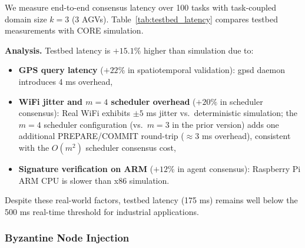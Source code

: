 \documentclass[manuscript,screen,review]{acmart}
\begin{document}
We measure end-to-end consensus latency over 100 tasks with task-coupled domain size $k = 3$ (3 AGVs). Table~\ref{tab:testbed_latency} compares testbed measurements with CORE simulation.

\begin{table}[h]
\centering
\caption{Consensus Latency: Testbed vs.\ CORE Simulation ($k=3$, $m=4$)}
\label{tab:testbed_latency}
\small
{}
\end{table}

\textbf{Analysis.} Testbed latency is $+15.1\%$ higher than simulation due to:
\begin{itemize}
    \item \textbf{GPS query latency} ($+22\%$ in spatiotemporal validation): gpsd daemon introduces 4 ms overhead,
    \item \textbf{WiFi jitter and $m=4$ scheduler overhead} ($+20\%$ in scheduler consensus): Real WiFi exhibits $\pm 5$ ms jitter vs.\ deterministic simulation; the $m = 4$ scheduler configuration (vs.\ $m = 3$ in the prior version) adds one additional PREPARE/COMMIT round-trip ($\approx 3$ ms overhead), consistent with the $O(m^2)$ scheduler consensus cost,
    \item \textbf{Signature verification on ARM} ($+12\%$ in agent consensus): Raspberry Pi ARM CPU is slower than x86 simulation.
\end{itemize}
Despite these real-world factors, testbed latency (175 ms) remains well below the 500 ms real-time threshold for industrial applications.

\subsubsection{Byzantine Node Injection}
\label{sec:byzantine_injection}
\end{document}
